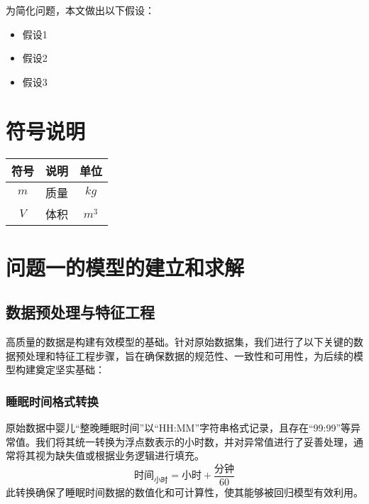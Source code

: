 \documentclass[withoutpreface,bwprint]{cumcmthesis}
\begin{document}
为简化问题，本文做出以下假设：

\begin{itemize}[itemindent=2em]
\item 假设1
\item 假设2
\item 假设3
\end{itemize}


\section{符号说明}
\begin{table}[H]
\centering
\begin{tabularx}{\textwidth}{CLC}
\toprule
符号    & 说明    & 单位 \\
\midrule
$m     $& 质量 & $kg$ \\
$V     $& 体积 & $m^3$ \\
\bottomrule
\end{tabularx}
\label{tab:符号说明}
\end{table}




\section{问题一的模型的建立和求解}

\subsection{数据预处理与特征工程}
高质量的数据是构建有效模型的基础。针对原始数据集，我们进行了以下关键的数据预处理和特征工程步骤，旨在确保数据的规范性、一致性和可用性，为后续的模型构建奠定坚实基础：

\subsubsection{睡眠时间格式转换}
原始数据中婴儿“整晚睡眠时间”以“HH:MM”字符串格式记录，且存在“99:99”等异常值。我们将其统一转换为浮点数表示的小时数，并对异常值进行了妥善处理，通常将其视为缺失值或根据业务逻辑进行填充。
$$ \text{时间}_{\text{小时}} = \text{小时} + \frac{\text{分钟}}{60} $$
此转换确保了睡眠时间数据的数值化和可计算性，使其能够被回归模型有效利用。
\end{document}
